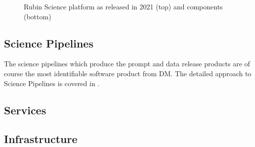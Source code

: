 \begin{figure}
\caption{Rubin Science platform as released in 2021 (top) and components (bottom) \label{fig:sciplat}}
\end{figure}

\subsection{Science Pipelines}\label{sec:pipes}
The science pipelines which produce the prompt and data release products are of course the most identifiable
software product from DM.
The detailed approach to Science Pipelines is covered in \cite{PSTN-019}.



\subsection{Services}

\subsection{Infrastructure}

